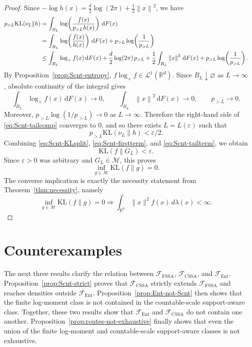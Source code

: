 \documentclass[11pt]{article}
\theoremstyle{definition}
\begin{document}
\begin{proof}
Since $-\log h(x)=\frac d2\log(2\pi)+\frac12\left\lVert x \right\rVert^2$, we have
\begin{align}
\label{eq:Scnt-tailcomp}
p_{>L}\mathrm{KL}(\nu_L\|h)
&=\int_{B_L}\log\!\left(\frac{f(x)}{p_{>L}h(x)}\right)\,\mathrm{d}F(x)\notag\\
&=\int_{B_L}\log\!\left(\frac{f(x)}{h(x)}\right)\,\mathrm{d}F(x)+p_{>L}\log\!\left(\frac1{p_{>L}}\right)\notag\\
&\le \int_{B_L}\log_+ f(x)\,\mathrm{d}F(x)
+\frac d2\log(2\pi)\,p_{>L}
+\frac12\int_{B_L}\left\lVert x \right\rVert^2\,\mathrm{d}F(x)
+p_{>L}\log\!\left(\frac1{p_{>L}}\right).
\end{align}
By Proposition~\ref{prop:Scnt-entropy}, $f\log_+f\in \mathcal L^1(\mathbb{R}^d)$. Since $B_L\downarrow\varnothing$ as $L\to\infty$, absolute continuity of the integral gives
\[
\int_{B_L}\log_+ f(x)\,\mathrm{d}F(x)\to0,
\qquad
\int_{B_L}\left\lVert x \right\rVert^2\,\mathrm{d}F(x)\to0,
\qquad
p_{>L}\to0.
\]
Moreover, $p_{>L}\log(1/p_{>L})\to0$ as $L\to\infty$. Therefore the right-hand side of \eqref{eq:Scnt-tailcomp} converges to $0$, and so there exists $L=L(\varepsilon)$ such that
\begin{equation}
\label{eq:Scnt-tailterm}
p_{>L}\mathrm{KL}(\nu_L\|h)<\varepsilon/2.
\end{equation}
Combining \eqref{eq:Scnt-KLsplit}, \eqref{eq:Scnt-firstterm}, and \eqref{eq:Scnt-tailterm}, we obtain
\[
\mathrm{KL}(f\|G_L)<\varepsilon.
\]
Since $\varepsilon>0$ was arbitrary and $G_L\in\mathcal M$, this proves
\[
\inf_{g\in\mathcal M}\mathrm{KL}(f\|g)=0.
\]
The converse implication is exactly the necessity statement from Theorem~\ref{thm:necessity}, namely
\[
\inf_{g\in\mathcal M}\mathrm{KL}(f\|g)=0
\Longrightarrow
\int_{\mathbb R^d} \|x\|^2 f(x)\,d\lambda(x)<\infty.
\]
\end{proof}

\section{Counterexamples}\label{sec:counterexamples}

The next three results clarify the relation between $\mathcal F_{\mathrm{FSSA}}$, $\mathcal F_{\mathrm{CSSA}}$, and $\mathcal F_{\mathrm{Ent}}$. Proposition~\ref{prop:Scnt-strict} proves that $\mathcal F_{\mathrm{CSSA}}$ strictly extends $\mathcal F_{\mathrm{FSSA}}$ and reaches densities outside $\mathcal F_{\mathrm{Ent}}$. Proposition~\ref{prop:Ent-not-Scnt} then shows that the finite log-moment class is not contained in the countable-scale support-aware class. Together, these two results show that $\mathcal F_{\mathrm{Ent}}$ and $\mathcal F_{\mathrm{CSSA}}$ do not contain one another. Proposition~\ref{prop:routes-not-exhaustive} finally shows that even the union of the finite log-moment and countable-scale support-aware classes is not exhaustive.
\end{document}
